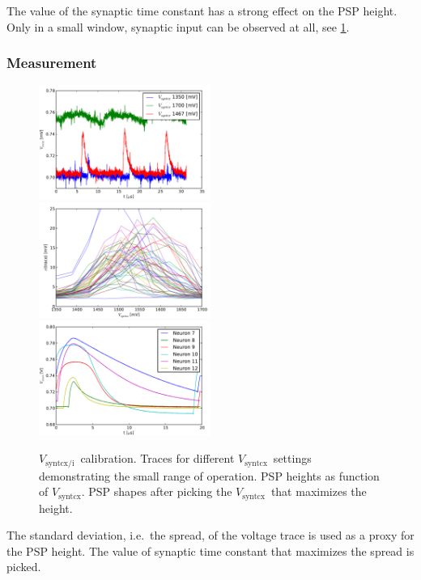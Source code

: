 \documentclass[12pt,a4paper,bibliography=totocnumbered,listof=totocnumbered, DIV12]{scrartcl}
\newcommand{\vsyntc}{\ensuremath{V_{\text{syntcx/i}}}}
\newcommand{\vsyntcx}{\ensuremath{V_{\text{syntcx}}}}
\begin{document}
The value of the synaptic time constant has a strong effect on the PSP
height. Only in a small window, synaptic input can be observed at all,
see \cref{fig:v_syntc_calibration}.

\subsubsection*{Measurement}

\begin{figure}
  \centering
  \includegraphics[width=0.5\textwidth]{figures/V_syntcx_trace}%
  \includegraphics[width=0.5\textwidth]{figures/V_syntcx_scan}\\
  \includegraphics[width=0.5\textwidth]{figures/V_syntcx_psp_max_traces}
  \caption{\vsyntc\ calibration. Traces for different \vsyntcx\
    settings demonstrating the small range of operation. PSP heights
    as function of \vsyntcx. PSP shapes after picking the \vsyntcx\
    that maximizes the height.}
  \label{fig:v_syntc_calibration}
\end{figure}

The standard deviation, i.e.\ the spread, of the voltage trace is used
as a proxy for the PSP height. The value of synaptic time constant
that maximizes the spread is picked.
\end{document}
